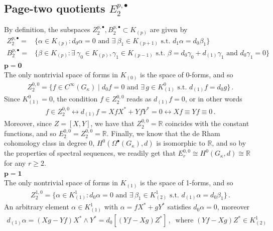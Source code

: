 \documentclass[10pt]{amsart}
\theoremstyle{remark}
\numberwithin{equation}{section}
\begin{document}
\subsection{Page-two quotients $E_2^{p,\bullet}$} By definition, the subspaces $Z_2^{p,\bullet},B_2^{p,\bullet}\subset K_{(p)}$ are given by
\begin{align*}
    Z_2^{p,\bullet}=&\lbrace \alpha\in  K_{(p)}: d_0\alpha=0\text{ and }\exists\ \beta_1\in K_{(p+1)}\text{ s.t. }d_1\alpha=d_0\beta_1\rbrace\\
    B_2^{p,\bullet}=&\lbrace\beta\in K_{(p)}: \exists\ \gamma_0\in K_{(p)}, \gamma_1\in K_{(p-1)}\text{ s.t. }\beta=d_0\gamma_0+d_{(1)}\gamma_1\text{ and }d_0\gamma_1=0\rbrace 
\end{align*}
$\mathbf{p=0}$\\
The only nontrivial space of forms in $K_{(0)}$ is the space of 0-forms, and so
\begin{align*}
    Z_2^{0,0}=\lbrace f\in C^\infty(G_\kappa)\mid d_0f=0\text{ and }\exists\, g\in K^0_{(1)}\text{ s.t. }d_{(1)}f=d_0 g\rbrace\,.
\end{align*}
Since $K^0_{(1)}=0$, the condition $f\in Z_2^{0,0}$ reads as $d_{(1)}f=0$, or in other words
\begin{align*}
    f\in Z_2^{0,0}\longleftrightarrow d_{(1)}f=Xf X^\ast+Yf Y^\ast=0\longleftrightarrow Xf\equiv Yf\equiv 0\,.
\end{align*}
Moreover, since $Z=[X,Y]$, we have that $Z_2^{0,0}=\mathbb{R}$ coincides with the constant functions, and so $E_2^{0,0}=Z_2^{0,0}=\mathbb{R}$. Finally, we know that the de Rham cohomology class in degree 0, $H^0(\Omega^\bullet(G_\kappa),d)$ is isomorphic to $\mathbb R$, and so by the properties of spectral sequences, we readily get that $E_r^{0,0}\cong H^0(G_\kappa,d)\cong\mathbb R$ for any $r\ge 2$.\\
$\mathbf{p=1}$\\ 
The only nontrivial space of forms in $K_{(1)}$ is the space of 1-forms, and so
\begin{align*}
    Z_2^{1,0}=\lbrace\alpha\in K_{(1)}^1: d_0\alpha=0\text{ and }\exists\,\beta_1\in K_{(2)}^1\text{ s.t. }d_{(1)}\alpha=d_0\beta_1\rbrace\,.
\end{align*}An arbitrary element $\alpha\in K_{(1)}^1$ with $\alpha=fX^\ast+gY^\ast$ satisfies $d_0\alpha=0$, moreover
\begin{align*}
    d_{(1)}\alpha=(Xg-Yf)X^\ast\wedge Y^\ast=d_0[(Yf-Xg)Z^\ast]\,,\ \text{ where }(Yf-Xg)Z^\ast\in K^1_{(2)}
\end{align*}
\end{document}
